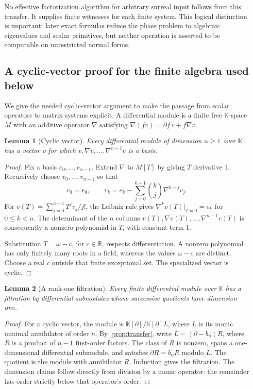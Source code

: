 \documentclass[11pt,a4paper]{article}
\numberwithin{equation}{section}
\newtheorem{lemma}[lemma]{Lemma}
\theoremstyle{definition}
\theoremstyle{remark}
\newcommand{\K}{\mathbb K}
\newcommand{\R}{\mathbb R}
\begin{document}
No effective factorization algorithm for arbitrary surreal input follows
from this transfer. It supplies finite witnesses for each finite system.
This logical distinction is important: later exact formulas reduce the
phase problem to algebraic eigenvalues and scalar primitives, but neither
operation is asserted to be computable on unrestricted normal forms.

\subsection{A cyclic-vector proof for the finite algebra used below}
We give the needed cyclic-vector argument to make the passage from scalar
operators to matrix systems explicit. A differential module is a finite
free $\K$-space $M$ with an additive operator $\nabla$ satisfying
$\nabla(fv)=\partial f\,v+f\nabla v$.

\begin{lemma}[Cyclic vector]\label{lem:cyclic}
Every differential module of dimension $n\ge1$ over $\K$ has a vector $v$
for which $v,\nabla v,\ldots,\nabla^{n-1}v$ is a basis.
\end{lemma}
\begin{proof}
Fix a basis $e_0,\ldots,e_{n-1}$. Extend $\nabla$ to $M[T]$ by giving $T$
derivative $1$. Recursively choose $v_0,\ldots,v_{n-1}$ so that
\[
 v_0=e_0,\qquad
 v_k=e_k-\sum_{j=0}^{k-1}\binom{k}{j}\nabla^{k-j}v_j.
\]
For $v(T)=\sum_{j=0}^{n-1}T^jv_j/j!$, the Leibniz rule gives
$\nabla^k v(T)|_{T=0}=e_k$ for $0\le k<n$. The determinant of the $n$
columns $v(T),\nabla v(T),\ldots,\nabla^{n-1}v(T)$ is consequently a
nonzero polynomial in $T$, with constant term $1$.

Substitution $T=\omega-c$, for $c\in\R$, respects differentiation. A
nonzero polynomial has only finitely many roots in a field, whereas the
values $\omega-c$ are distinct. Choose a real $c$ outside that finite
exceptional set. The specialized vector is cyclic.
\end{proof}

\begin{lemma}[A rank-one filtration]\label{lem:flag}
Every finite differential module over $\K$ has a filtration by differential
submodules whose successive quotients have dimension one.
\end{lemma}
\begin{proof}
For a cyclic vector, the module is
$\K[\partial]/\K[\partial]L$, where $L$ is its monic minimal annihilator
of order $n$. By \cref{prop:transfer}, write
$L=(\partial-b_n)R$, where $R$ is a product of $n-1$ first-order factors.
The class of $R$ is nonzero, spans a one-dimensional differential submodule,
and satisfies $\partial R=b_nR$ modulo $L$. The quotient is the module
with annihilator $R$. Induction gives the filtration. The dimension claims
follow directly from division by a monic operator: the remainder has order
strictly below that operator's order.
\end{proof}
\end{document}
